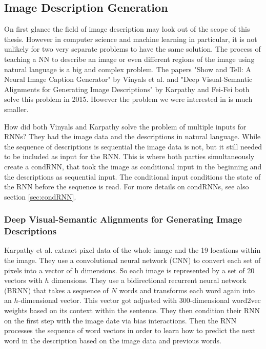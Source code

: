 \documentclass[
	ngerman,
	ruledheaders=section,%
	class=report,%
	thesis={type=bachelor},%
	accentcolor=9c,%
	custommargins=true,%
	marginpar=false,%
	parskip=half-,%
	fontsize=11pt,%
]{tudapub}
\begin{document}


\subsection{Image Description Generation}
\label{sec:imagedesc}

On first glance the field of image description may look out of the scope of this thesis.
However in computer science and machine learning in particular, it is not unlikely for two very separate problems to have the same solution.
The process of teaching a NN to describe an image or even different regions of the image using natural language is a big and complex problem.
The papers "Show and Tell: A Neural Image Caption Generator" by Vinyals et al. \cite{vinyalsShowTellNeural2015} and "Deep Visual-Semantic Alignments for Generating Image Descriptions" by Karpathy and Fei-Fei \cite{karpathyDeepVisualSemanticAlignments2015} both solve this problem in 2015.
However the problem we were interested in is much smaller.

How did both Vinyals and Karpathy solve the problem of multiple inputs for RNNs?
They had the image data and the descriptions in natural language.
While the sequence of descriptions is sequential the image data is not, but it still needed to be included as input for the RNN.
This is where both parties simultaneously create a condRNN, that took the image as conditional input in the beginning and the descriptions as sequential input.
The conditional input conditions the state of the RNN before the sequence is read.
For more details on condRNNs, see also section \ref{sec:condRNN}.

\subsubsection{Deep Visual-Semantic Alignments for Generating Image Descriptions} %
\label{sec:karpathy}

Karpathy et al. extract pixel data of the whole image and the 19 locations within the image.
They use a convolutional neural network (CNN) to convert each set of pixels into a vector of h dimensions.
So each image is represented by a set of 20 vectors with $h$ dimensions.
They use a bidirectional recurrent neural network (BRNN) that takes a sequence of $N$ words and transforms each word again into an $h$-dimensional vector.
This vector got adjusted with 300-dimensional word2vec weights based on its context within the sentence.
They then condition their RNN on the first step with the image date via bias interactions.
Then the RNN processes the sequence of word vectors in order to learn how to predict the next word in the description based on the image data and previous words.
\end{document}
